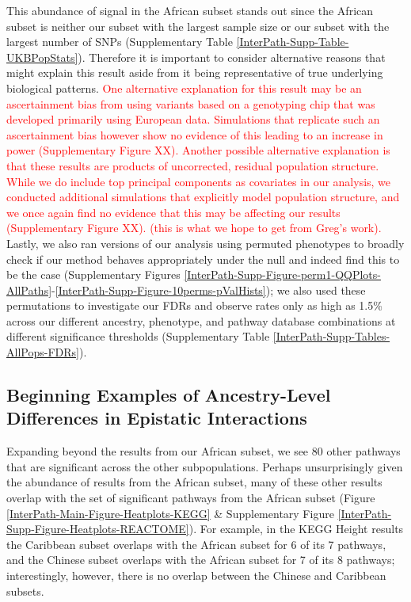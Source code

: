 \documentclass[12pt,a4paper]{article}
\begin{document}
This abundance of signal in the African subset stands out since the African subset is neither our subset with the largest sample size or our subset with the largest number of SNPs (Supplementary Table \ref{InterPath-Supp-Table-UKBPopStats}). Therefore it is important to consider alternative reasons that might explain this result aside from it being representative of true underlying biological patterns. \textcolor{red}{One alternative explanation for this result may be an ascertainment bias from using variants based on a genotyping chip that was developed primarily using European data. Simulations that replicate such an ascertainment bias however show no evidence of this leading to an increase in power (Supplementary Figure XX). Another possible alternative explanation is that these results are products of uncorrected, residual population structure. While we do include top principal components as covariates in our analysis, we conducted additional simulations that explicitly model population structure, and we once again find no evidence that this may be affecting our results (Supplementary Figure XX). (this is what we hope to get from Greg's work).} Lastly, we also ran versions of our analysis using permuted phenotypes to broadly check if our method behaves appropriately under the null and indeed find this to be the case (Supplementary Figures \ref{InterPath-Supp-Figure-perm1-QQPlots-AllPaths}-\ref{InterPath-Supp-Figure-10perms-pValHists}); we also used these permutations to investigate our FDRs and observe rates only as high as 1.5\% across our different ancestry, phenotype, and pathway database combinations at different significance thresholds (Supplementary Table \ref{InterPath-Supp-Tables-AllPops-FDRs}).

\subsection{Beginning Examples of Ancestry-Level Differences in Epistatic Interactions}

Expanding beyond the results from our African subset, we see 80 other pathways that are significant across the other subpopulations. Perhaps unsurprisingly given the abundance of results from the African subset, many of these other results overlap with the set of significant pathways from the African subset (Figure \ref{InterPath-Main-Figure-Heatplots-KEGG} \& Supplementary Figure \ref{InterPath-Supp-Figure-Heatplots-REACTOME}). For example, in the KEGG Height results the Caribbean subset overlaps with the African subset for 6 of its 7 pathways, and the Chinese subset overlaps with the African subset for 7 of its 8 pathways; interestingly, however, there is no overlap between the Chinese and Caribbean subsets. 
\end{document}
